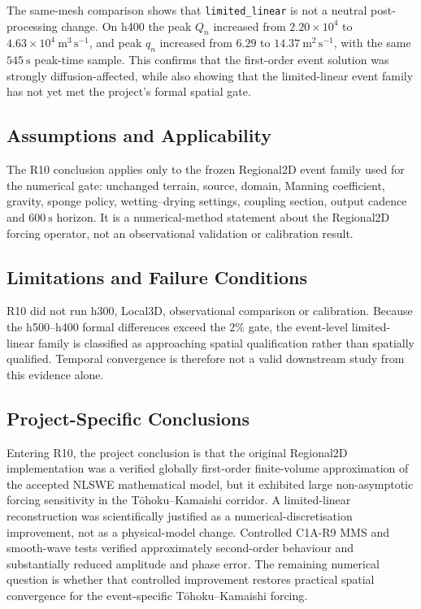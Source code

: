 The same-mesh comparison shows that \texttt{limited\_linear} is not a
neutral post-processing change. On h400 the peak $Q_n$ increased from
$2.20\times 10^4$ to $4.63\times 10^4~\mathrm{m^3\,s^{-1}}$, and peak
$q_n$ increased from $6.29$ to $14.37~\mathrm{m^2\,s^{-1}}$, with the
same $545~\mathrm{s}$ peak-time sample. This confirms that the
first-order event solution was strongly diffusion-affected, while also
showing that the limited-linear event family has not yet met the
project's formal spatial gate.

\subsection{Assumptions and Applicability}
\label{sec:res-ver-cnv-assumptions}

The R10 conclusion applies only to the frozen Regional2D event family
used for the numerical gate: unchanged terrain, source, domain,
Manning coefficient, gravity, sponge policy, wetting--drying settings,
coupling section, output cadence and $600~\mathrm{s}$ horizon. It is a
numerical-method statement about the Regional2D forcing operator, not an
observational validation or calibration result.

\subsection{Limitations and Failure Conditions}
\label{sec:res-ver-cnv-limitations}

R10 did not run h300, Local3D, observational comparison or calibration.
Because the h500--h400 formal differences exceed the $2\%$ gate, the
event-level limited-linear family is classified as approaching spatial
qualification rather than spatially qualified. Temporal convergence is
therefore not a valid downstream study from this evidence alone.

\subsection{Project-Specific Conclusions}
\label{sec:res-ver-cnv-conclusions}

Entering R10, the project conclusion is that the original Regional2D
implementation was a verified globally first-order finite-volume
approximation of the accepted NLSWE mathematical model, but it exhibited
large non-asymptotic forcing sensitivity in the Tōhoku--Kamaishi
corridor. A limited-linear reconstruction was scientifically justified
as a numerical-discretisation improvement, not as a physical-model
change. Controlled C1A-R9 MMS and smooth-wave tests verified
approximately second-order behaviour and substantially reduced
amplitude and phase error. The remaining numerical question is whether
that controlled improvement restores practical spatial convergence for
the event-specific Tōhoku--Kamaishi forcing.

